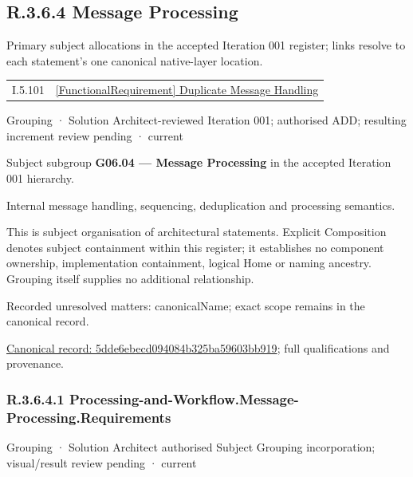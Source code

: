 \subsection*{R.3.6.4 Message Processing}
\label{navigation:R.3.6.4}

Primary subject allocations in the accepted Iteration 001 register; links resolve to each statement’s one canonical native-layer location.\par
\begin{longtable}{p{.22\linewidth}p{.73\linewidth}}
I.5.101 & \hyperref[element:76a67526fcdf40999f375a8cac54d5ef]{[FunctionalRequirement] Duplicate Message Handling} \\
\end{longtable}
\label{element:5dde6ebecd094084b325ba59603bb919}
{\small Grouping · Solution Architect-reviewed Iteration 001; authorised ADD; resulting increment review pending · current}\par

Subject subgroup \textbf{G06.04 — Message Processing} in the accepted Iteration 001 hierarchy.



Internal message handling, sequencing, deduplication and processing semantics.



This is subject organisation of architectural statements. Explicit Composition denotes subject containment within this register; it establishes no component ownership, implementation containment, logical Home or naming ancestry. Grouping itself supplies no additional relationship.


{\small Recorded unresolved matters: canonicalName; exact scope remains in the canonical record.}\par
{\footnotesize \href{../../../../continuum/grouping/5dde6ebecd094084b325ba59603bb919.md}{Canonical record: 5dde6ebecd094084b325ba59603bb919}; full qualifications and provenance.}\par
\subsubsection*{R.3.6.4.1 Processing-and-Workflow.Message-Processing.Requirements}
\label{navigation:R.3.6.4.1}

\label{element:e576768ae5cd4522b760c36d2b364be2}
{\small Grouping · Solution Architect authorised Subject Grouping incorporation; visual/result review pending · current}\par

